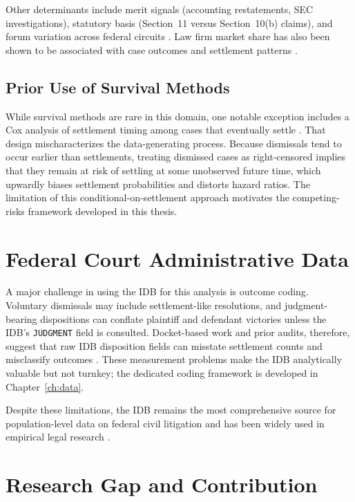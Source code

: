 Other determinants include merit signals (accounting
restatements, SEC investigations), statutory basis
(Section~11 versus Section~10(b) claims), and forum variation
across federal circuits \citep{johnson2007, choi2007, perino2003}.
Law firm market share has also been shown to be associated
with case outcomes and settlement patterns \citep{wang2022}.

\subsection{Prior Use of Survival Methods}

While survival methods are rare in this domain, one notable
exception includes a Cox analysis of settlement timing among
cases that eventually settle \citep{brochet2014}. That design
mischaracterizes the data-generating process. Because
dismissals tend to occur earlier than settlements, treating
dismissed cases as right-censored implies that they remain at
risk of settling at some unobserved future time, which
upwardly biases settlement probabilities and distorts hazard
ratios. The limitation of this conditional-on-settlement
approach motivates the competing-risks framework developed in
this thesis.

\section{Federal Court Administrative Data}

A major challenge in using the IDB for this analysis is outcome coding. Voluntary dismissals may
include settlement-like resolutions, and judgment-bearing
dispositions can conflate plaintiff and defendant victories
unless the IDB's \texttt{JUDGMENT} field is consulted.
Docket-based work and prior audits, therefore, suggest that raw
IDB disposition fields can misstate settlement counts and
misclassify outcomes \citep{scales2024, clermont2002,
hadfield2004}. These measurement problems make the IDB
analytically valuable but not turnkey; the dedicated coding
framework is developed in Chapter~\ref{ch:data}.

Despite these limitations, the IDB remains the most
comprehensive source for population-level data on federal civil
litigation and has been widely used in empirical legal research
\citep{clermont2002, scales2024}.

\section{Research Gap and Contribution}

